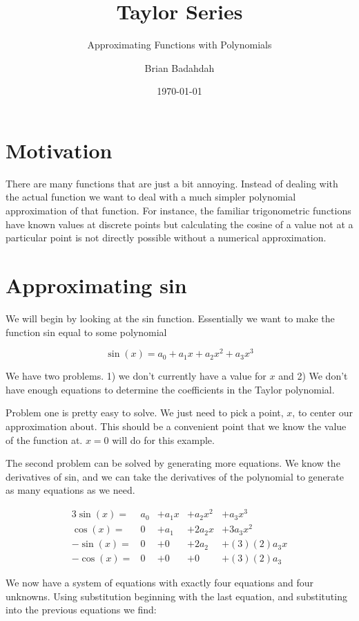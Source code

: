 \documentclass[landscape, twocolumn, 12pt]{article}
\title{Taylor Series}
\subtitle{Approximating Functions with Polynomials}
\author{Brian Badahdah}
\date{\today}
\begin{document}
\maketitle
\section{Motivation}

There are many functions that are just a bit annoying. Instead of dealing with the actual function we want to deal with a much simpler polynomial approximation of that function. For instance, the familiar trigonometric functions have known values at discrete points but calculating the cosine of a value not at a particular point is not directly possible without a numerical approximation.

\section{Approximating sin}
We will begin by looking at the sin function. Essentially we want to make the function sin equal to some polynomial

\begin{equation}
  \sin(x)=a_0 + a_1x+a_2x^2 + a_3x^3
\end{equation}

We have two problems. 1) we don't currently have a value for $x$ and 2) We don't have enough equations to determine the coefficients in the Taylor polynomial.

Problem one is pretty easy to solve. We just need to pick a point, $x$, to center our approximation about. This should be a convenient point that we know the value of the function at. $x=0$ will do for this example.

The second problem can be solved by generating more equations. We know the derivatives of sin, and we can take the derivatives of the polynomial to generate as many equations as we need.

\begin{alignat}{3}
  \sin(x)  = &a_0 &+a_1x &+a_2x^2 &+a_3x^3\\
  \cos(x)  = &0   &+a_1  &+2a_2x  &+3a_3x^2\\
  -\sin(x) = &0   &+0    &+2a_2   &+(3)(2)a_3x\\
  -\cos(x) = &0   &+0    &+0      &+(3)(2)a_3
\end{alignat}

We now have a system of equations with exactly four equations and four unknowns. Using substitution beginning with the last equation, and substituting into the previous equations we find:
\end{document}
